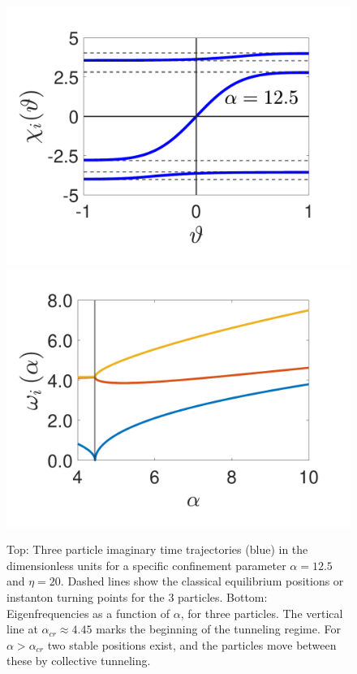 \documentclass[prb,twocolumn,showpacs,preprintnumbers,amsmath,amssymb, superscriptaddress]{revtex4-2}
\newcommand{\1}{{1\hspace*{-0.5ex} \textrm{l} \hspace*{0.5ex}}}
\begin{document}
 \begin{figure}[h!]
    \begin{center}
    	\includegraphics[width=0.8\columnwidth]{Fig_3Particle_Trajectory}
     	\includegraphics[width=0.8\columnwidth]{Fig_Freqs.pdf}
		
     \caption{Top: Three particle imaginary time trajectories (blue) in the dimensionless units for a specific confinement parameter $\alpha = 12.5$ and $\eta = 20$. Dashed lines show the classical equilibrium positions or instanton turning points for the 3 particles. Bottom: Eigenfrequencies as a function of $\alpha$, for three particles. The vertical line at $\alpha_{cr} \approx 4.45$ marks the beginning of the tunneling regime. For $\alpha > \alpha_{cr}$ two stable positions exist, and the particles move between these by collective tunneling.}
     \label{fig:traj}
    \end{center}
\end{figure}  
\end{document}
